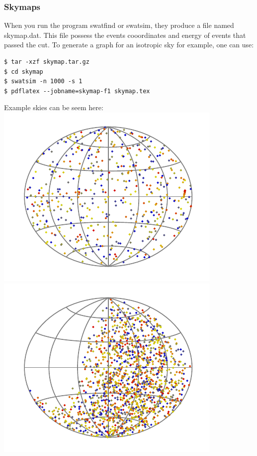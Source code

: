 \documentclass[12pt]{article}
\begin{document}
\subsubsection{Skymaps}
When you run the program swatfind or swatsim, they produce a file named
skymap.dat. This file possess the events cooordinates and energy of events that passed
the cut. To generate a graph for an isotropic sky for example, one can use:
{ \color{brown}
\begin{lstlisting}
$ tar -xzf skymap.tar.gz
$ cd skymap
$ swatsim -n 1000 -s 1
$ pdflatex --jobname=skymap-f1 skymap.tex
\end{lstlisting}
}
Example skies can be seem here:\\
\includegraphics[scale=1.0]{skymap-sim.pdf} 
\includegraphics[scale=1.0]{skymap.pdf}
\end{document}
